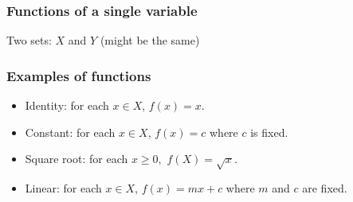 \documentclass[xcolor=pdftex,dvipsnames]{beamer}
\begin{document}
\begin{frame}\frametitle{Functions of a single variable}

Two sets: $X$ and $Y$ (might be the same)

\bigskip

\bigskip


\begin{center}
\end{center}
\end{frame}




\begin{frame}
\frametitle{Examples of functions}
\begin{itemize}[<+->]
\item Identity: for each $x\in X$, {\color{red}$f(x)=x$}.
\item Constant: for each $x\in X$,{\color{red} $f(x)=c$} where $c$ is fixed.
\item Square root: for each $x\geq 0,$ {\color{red} $f(X) = \sqrt{x}$}.
\item Linear: for each $x\in X$, {\color{red}$f(x) = mx+c$} where $m$ and $c$ are fixed.
\end{itemize}
\end{frame}
\end{document}
